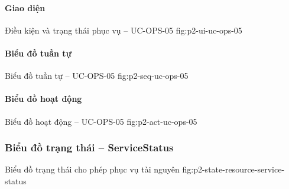 \par\medskip
\noindent\begin{minipage}{\linewidth}
\paragraph{Giao diện}
  {Điều kiện và trạng thái phục vụ -- UC-OPS-05}
  {fig:p2-ui-uc-ops-05}
\end{minipage}\par

\clearpage
\paragraph{Biểu đồ tuần tự}
  {Biểu đồ tuần tự -- UC-OPS-05}
  {fig:p2-seq-uc-ops-05}

\clearpage
\paragraph{Biểu đồ hoạt động}
  {Biểu đồ hoạt động -- UC-OPS-05}
  {fig:p2-act-uc-ops-05}

\clearpage
\subsubsection{Biểu đồ trạng thái -- ServiceStatus}
  {Biểu đồ trạng thái cho phép phục vụ tài nguyên}
  {fig:p2-state-resource-service-status}
\clearpage
